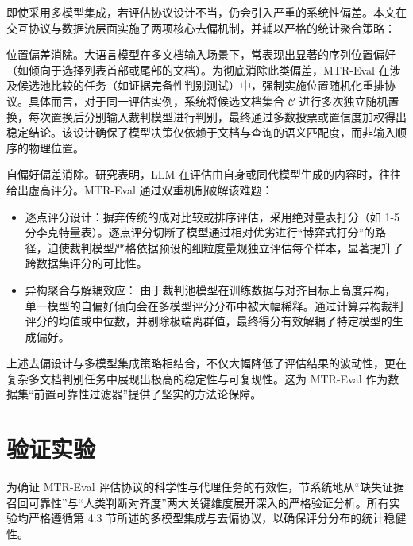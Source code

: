 即使采用多模型集成，若评估协议设计不当，仍会引入严重的系统性偏差。本文在交互协议与数据流层面实施了两项核心去偏机制，并辅以严格的统计聚合策略：



位置偏差消除。大语言模型在多文档输入场景下，常表现出显著的序列位置偏好（如倾向于选择列表首部或尾部的文档）。为彻底消除此类偏差，MTR-Eval 在涉及候选池比较的任务（如证据完备性判别测试）中，强制实施位置随机化重排协议。具体而言，对于同一评估实例，系统将候选文档集合 $\mathcal{C}$ 进行多次独立随机置换，每次置换后分别输入裁判模型进行判别，最终通过多数投票或置信度加权得出稳定结论。该设计确保了模型决策仅依赖于文档与查询的语义匹配度，而非输入顺序的物理位置。



自偏好偏差消除。研究表明，LLM 在评估由自身或同代模型生成的内容时，往往给出虚高评分。MTR-Eval 通过双重机制破解该难题：

\begin{itemize}

    \item 逐点评分设计：摒弃传统的成对比较或排序评估，采用绝对量表打分（如 1-5 分李克特量表）。逐点评分切断了模型通过相对优劣进行“博弈式打分”的路径，迫使裁判模型严格依据预设的细粒度量规独立评估每个样本，显著提升了跨数据集评分的可比性。

    \item 异构聚合与解耦效应： 由于裁判池模型在训练数据与对齐目标上高度异构，单一模型的自偏好倾向会在多模型评分分布中被大幅稀释。通过计算异构裁判评分的均值或中位数，并剔除极端离群值，最终得分有效解耦了特定模型的生成偏好。

\end{itemize}



上述去偏设计与多模型集成策略相结合，不仅大幅降低了评估结果的波动性，更在复杂多文档判别任务中展现出极高的稳定性与可复现性。这为 MTR-Eval 作为数据集“前置可靠性过滤器”提供了坚实的方法论保障。



\section{验证实验}

\label{sec:validation_experiments}



为确证 MTR-Eval 评估协议的科学性与代理任务的有效性，节系统地从“缺失证据召回可靠性”与“人类判断对齐度”两大关键维度展开深入的严格验证分析。所有实验均严格遵循第 4.3 节所述的多模型集成与去偏协议，以确保评分分布的统计稳健性。



